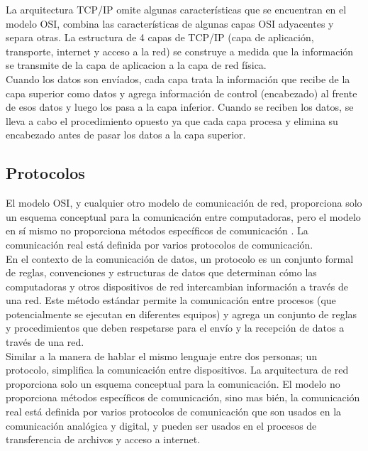 La arquitectura TCP/IP omite algunas características que se encuentran en el modelo OSI, combina las características de algunas capas OSI adyacentes y separa otras. La estructura de 4 capas de TCP/IP (capa de aplicación, transporte, internet y acceso a la red) se construye a medida que la información se transmite de la capa de aplicacion a la capa de red física.\\

Cuando los datos son envíados, cada capa trata la información que recibe de la capa superior como datos y agrega información de control (encabezado) al frente de esos datos y luego los pasa a la capa inferior. Cuando se reciben los datos, se lleva a cabo el procedimiento opuesto ya que cada capa procesa y elimina su encabezado antes de pasar los datos a la capa superior.\\

\subsection{Protocolos}
El modelo OSI, y cualquier otro modelo de comunicación de red, proporciona solo un esquema conceptual para la comunicación entre computadoras, pero el modelo en sí mismo no proporciona métodos específicos de comunicación \cite{wikipedia:modeloosi}. La comunicación real está definida por varios protocolos de comunicación.\\

En el contexto de la comunicación de datos, un protocolo es un conjunto formal de reglas, convenciones y estructuras de datos que determinan cómo las computadoras y otros dispositivos de red intercambian información a través de una red. Este método estándar permite la comunicación entre procesos (que potencialmente se ejecutan en diferentes equipos) y agrega un conjunto de reglas y procedimientos que deben respetarse para el envío y la recepción de datos a través de una red.\\

Similar a la manera de hablar el mismo lenguaje entre dos personas; un protocolo, simplifica la comunicación entre dispositivos. La arquitectura de red proporciona solo un esquema conceptual para la comunicación. El modelo no proporciona métodos específicos de comunicación, sino mas bién, la comunicación real está definida por varios protocolos de comunicación que son usados en la comunicación analógica y digital, y pueden ser usados en el procesos de transferencia de archivos y acceso a internet.\\

